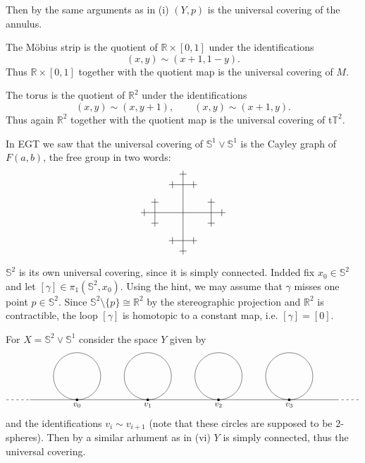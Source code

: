 \documentclass[11pt]{book}
\numberwithin{dummy}{section}
\theoremstyle{nonumberbreak}
\newenvironment{sol}[1][]{\ifthenelse{\equal{#1}{}}{\solution}{\solution[#1]}\rm}{\endsolution}
\newenvironment{prob}[1][]{\ifthenelse{\equal{#1}{}}{\problem}{\problem[#1]}\rm}{\endproblem}
\begin{document}
\begin{spacing}{1.4}
\begin{prob}
\begin{sol}
\begin{compactenum}
Then by the same arguments as in (i) $(Y,p)$ is the universal covering of the annulus.
\item The Möbius strip is the quotient of $\mathbb{R} \times [0,1]$ under the identifications
$$(x,y) \sim (x+1, 1-y).$$
Thus $\mathbb{R} \times [0,1]$ together with the quotient map is the universal covering of $M$.
\item The torus is the quotient of $\mathbb{R}^2$ under the identifications
$$(x,y) \sim (x,y+1), \qquad (x,y) \sim (x+1,y).$$
Thus again $\mathbb{R}^2$ together with the quotient map is the universal covering of t$\mathbb{T}^2$.
\item In EGT we saw that the universal covering of $\mathbb{S}^1 \vee \mathbb{S}^1$ is the Cayley graph of $F(a,b)$, the free group in two words:
$$
\begin{tikzpicture}
\draw (-1.5,0) -- (1.5,0);
\draw (0,-1.5) -- (0,1.5);
\draw (-0.5,1) -- (0.5,1);
\draw (-0.5,-1) -- (0.5,-1);
\draw (-1,-0.5) -- (-1,0.5);
\draw (1,-0.5) -- (1,0.5);
\draw (0.375,0.875) -- (0.375,1.125);
\draw (-0.375,0.875) -- (-0.375,1.125);
\draw (0.375,-0.875) -- (0.375,-1.125);
\draw (-0.375,-0.875) -- (-0.375,-1.125);
\draw (-0.125,1.375) -- (0.125,1.375);
\draw (-0.125,-1.375) -- (0.125,-1.375);
\draw (0.875,-0.375) -- (1.125,-0.375);
\draw (0.875,0.375) -- (1.125,0.375);
\draw (-0.875,-0.375) -- (-1.125,-0.375);
\draw (-0.875,0.375) -- (-1.125,0.375);
\draw (1.375,-0.125) -- (1.375,0.125);
\draw (-1.375,-0.125) -- (-1.375,0.125);
\end{tikzpicture}
$$

\item $\mathbb{S}^2$ is its own universal covering, since it is simply connected. Indded fix $x_0 \in \mathbb{S}^2$ and let $[\gamma] \in \pi_1(\mathbb{S}^2,x_0)$. Using the hint, we may assume that $\gamma$ misses one point $p \in \mathbb{S}^2$. Since $\mathbb{S}^2 \setminus \{p\} \cong \mathbb{R}^2$ by the stereographic projection and $\mathbb{R}^2$ is contractible, the loop $[\gamma]$ is homotopic to a constant map, i.e. $[\gamma] = [0]$.
\item For $X= \mathbb{S}^2 \vee \mathbb{S}^1$ consider the space $Y$ given by 
$$
\begin{tikzpicture}
\draw (2,0) arc(0:360:1);
\draw (5,0) arc(0:360:1);
\draw (8,0) arc(0:360:1);
\draw (11,0) arc(0:360:1);
\draw[fill=black] (1.05,-1) arc(0:360:0.05);
\draw[fill=black] (4.05,-1) arc(0:360:0.05);
\draw[fill=black] (7.05,-1) arc(0:360:0.05);
\draw[fill=black] (10.05,-1) arc(0:360:0.05);
\draw (1,-1) node[below] {$v_0$};
\draw (4,-1) node[below] {$v_1$};
\draw (7,-1) node[below] {$v_2$};
\draw (10,-1) node[below] {$v_3$};
\draw (-1,-1) -- (12,-1);
\draw[dashed] (-2,-1) -- (-1,-1);
\draw[dashed] (12,-1) -- (13,-1);
\end{tikzpicture}
$$
and the identifications $v_i \sim v_{i+1}$ (note that these circles are supposed to be $2$-spheres). Then by a similar arhument as in (vi) $Y$ is simply connected, thus the universal covering.


\end{compactenum}
\end{sol}
\end{prob}
\end{spacing}
\end{document}
